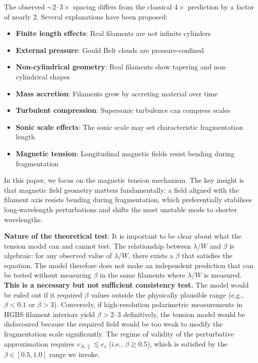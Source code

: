 \documentclass[11pt,a4paper]{article}
\begin{document}
The observed $\sim2$--$3\times$ spacing differs from the classical $4\times$ prediction by a factor of nearly 2. Several explanations have been proposed:

\begin{itemize}
    \item \textbf{Finite length effects}: Real filaments are not infinite cylinders \citep{Inutsuka1997}
    \item \textbf{External pressure}: Gould Belt clouds are pressure-confined \citep{Fischera2012}
    \item \textbf{Non-cylindrical geometry}: Real filaments show tapering and non-cylindrical shapes
    \item \textbf{Mass accretion}: Filaments grow by accreting material over time \citep{Heitsch2013, Chen2024}
    \item \textbf{Turbulent compression}: Supersonic turbulence can compress scales \citep{Padoan2011}
    \item \textbf{Sonic scale effects}: The sonic scale may set characteristic fragmentation length \citep{Federrath2016}
    \item \textbf{Magnetic tension}: Longitudinal magnetic fields resist bending during fragmentation
\end{itemize}

In this paper, we focus on the magnetic tension mechanism. The key insight is that magnetic field geometry matters fundamentally: a field aligned with the filament axis resists bending during fragmentation, which preferentially stabilises long-wavelength perturbations and shifts the most unstable mode to shorter wavelengths.

\textbf{Nature of the theoretical test}: It is important to be clear about what the tension model can and cannot test. The relationship between $\lambda/W$ and $\beta$ is algebraic: for any observed value of $\lambda/W$, there exists a $\beta$ that satisfies the equation. The model therefore does not make an independent prediction that can be tested without measuring $\beta$ in the same filaments where $\lambda/W$ is measured. \textbf{This is a necessary but not sufficient consistency test.} The model would be ruled out if it required $\beta$ values outside the physically plausible range (e.g., $\beta < 0.1$ or $\beta > 3$). Conversely, if high-resolution polarimetric measurements in HGBS filament interiors yield $\beta > 2$--$3$ definitively, the tension model would be disfavoured because the required field would be too weak to modify the fragmentation scale significantly. The regime of validity of the perturbative approximation requires $v_{A,\parallel} \lesssim c_s$ (i.e., $\beta \gtrsim 0.5$), which is satisfied by the $\beta \in [0.5, 1.0]$ range we invoke.
\end{document}
